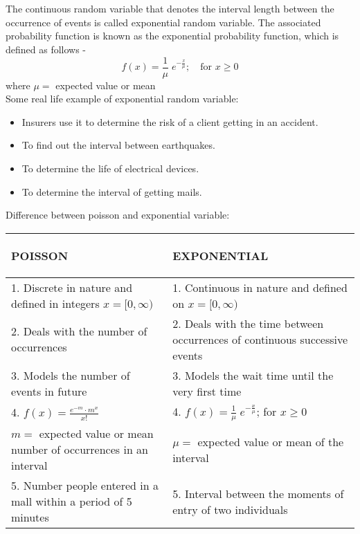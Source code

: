 \documentclass{article}
\begin{document}
\section{}
\Large{
    The continuous random variable that denotes the interval length between the occurrence of events is called exponential random variable. The associated probability function is known as the exponential probability function, which is defined as follows -
    $$f(x) = \frac{1}{\mu}\;e^{-\frac{x}{\mu}};\hspace{1em}\text{for } x\geq 0$$
    where $\mu=$ expected value or mean\\

    Some real life example of exponential random variable:
    \begin{itemize}
        \item Insurers use it to determine the risk of a client getting in an accident.
        \item To find out the interval between earthquakes.
        \item To determine the life of electrical devices.
        \item To determine the interval of getting mails.
    \end{itemize}
    \vspace{1em} 
    Difference between poisson and exponential variable:

    \vspace{1em}
    \renewcommand{\arraystretch}{1.5}
    \setlength{\tabcolsep}{1em}
    \begin{center}
    \begin{tabular}{ |p{7cm}|p{7cm}| }
        \hline
        \begin{center}\textbf{POISSON} \end{center}                                                            & \begin{center}\textbf{EXPONENTIAL}\end{center} \\ \hline
        1. Discrete in nature and defined in integers $x=[0, \infty)$& 1. Continuous in nature and defined on $x=[0, \infty)$\\ \hline
        2. Deals with the number of occurrences     & 2. Deals with the time between occurrences of continuous successive events\\ \hline 
        3. Models the number of events in future & 3. Models the wait time until the very first time\\ \hline
        4. $f(x) = \frac{e^{-m}\cdot m^x}{x!}$  & 4. $f(x) = \frac{1}{\mu}\;e^{-\frac{x}{\mu}}$; for $x \geq 0$ \\ 
        $m=$ expected value or mean number of occurrences in an interval & $\mu=$ expected value or mean of the interval \\ \hline
        5. Number people entered in a mall within a period of 5 minutes & 5. Interval between the moments of entry of two individuals\\ \hline
    \end{tabular}
    \end{center}
    
    
}
\end{document}
